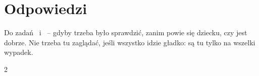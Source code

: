 \section*{Odpowiedzi}

Do zadań \lblAdivina\ i \lblRelaciona\ -- gdyby trzeba było sprawdzić,
zanim powie się dziecku, czy jest dobrze. Nie trzeba tu zaglądać, jeśli
wszystko idzie gładko: są tu tylko na wszelki wypadek.

\begin{multicols}{2}
\footnotesize
\raggedright
\begin{itemize}[leftmargin=0mm, label={}, itemsep=2mm, topsep=0mm]

\end{itemize}
\end{multicols}
\newpage
